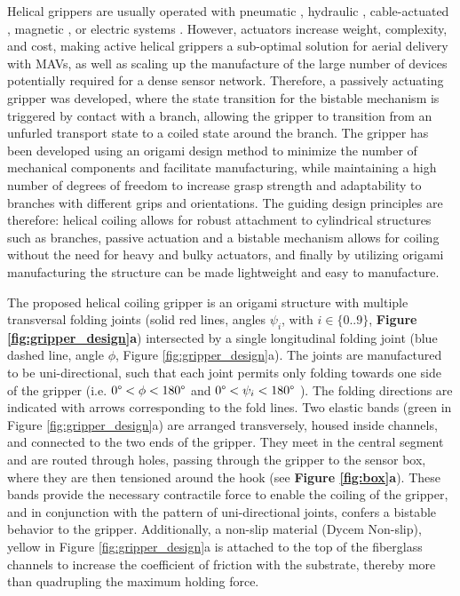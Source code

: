 Helical grippers are usually operated with pneumatic \cite{Kumar2018, Hu2020, Pal2020}, hydraulic \cite{Galloway2016, Hoang2020a}, cable-actuated \cite{Mazzolai2019}, magnetic \mbox{\cite{Wu2021a}}, or electric systems \mbox{\cite{Meder2022, Shao2018}}. However, actuators increase weight, complexity, and cost, making active helical grippers a sub-optimal solution for aerial delivery with MAVs, as well as scaling up the manufacture of the large number of devices potentially required for a dense sensor network. Therefore, a passively actuating gripper was developed, where the state transition for the bistable mechanism is triggered by contact with a branch, allowing the gripper to transition from an unfurled transport state to a coiled state around the branch. The gripper has been developed using an origami design method to minimize the number of mechanical components and facilitate manufacturing, while maintaining a high number of degrees of freedom to increase grasp strength and adaptability to branches with different grips and orientations. The guiding design principles are therefore: helical coiling allows for robust attachment to cylindrical structures such as branches, passive actuation and a bistable mechanism allows for coiling without the need for heavy and bulky actuators, and finally by utilizing origami manufacturing the structure can be made lightweight and easy to manufacture.

The proposed helical coiling gripper is an origami structure with multiple transversal folding joints (solid red lines, angles $\psi_i$, with $i \in \{0..9\}$, \textbf{Figure \ref{fig:gripper_design}a}) intersected by a single longitudinal folding joint (blue dashed line, angle $\phi$, Figure \ref{fig:gripper_design}a). The joints are manufactured to be uni-directional, such that each joint permits only folding towards one side of the gripper (i.e. $0\degree<\phi<180\degree$ and $0\degree<\psi_i<180\degree$ ). The folding directions are indicated with arrows corresponding to the fold lines. Two elastic bands (green in Figure \ref{fig:gripper_design}a) are arranged transversely, housed inside channels, and connected to the two ends of the gripper. They meet in the central segment and are routed through holes, passing through the gripper to the sensor box, where they are then tensioned around the hook (see \textbf{Figure \ref{fig:box}a}). These bands provide the necessary contractile force to enable the coiling of the gripper, and in conjunction with the pattern of uni-directional joints, confers a bistable behavior to the gripper. Additionally, a non-slip material (Dycem Non-slip), yellow in Figure \ref{fig:gripper_design}a is attached to the top of the fiberglass channels to increase the coefficient of friction with the substrate, thereby more than quadrupling the maximum holding force.

